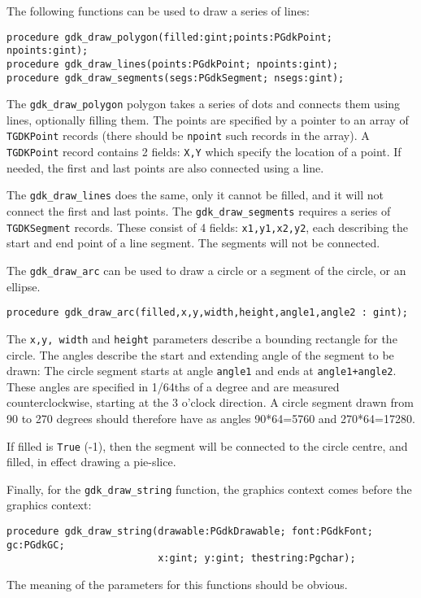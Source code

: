 \documentclass[10pt]{article}
\newcommand{\var}[1]{\texttt{#1}}
\begin{document}
The following functions can be used to draw a series of lines:
\begin{verbatim}
procedure gdk_draw_polygon(filled:gint;points:PGdkPoint; npoints:gint);
procedure gdk_draw_lines(points:PGdkPoint; npoints:gint);
procedure gdk_draw_segments(segs:PGdkSegment; nsegs:gint);
\end{verbatim}
The \var{gdk\_draw\_polygon} polygon takes a series of dots and connects 
them using lines, optionally filling them. The points are specified by a
pointer to an array of \var{TGDKPoint} records (there should be \var{npoint}
such records in the array). 
A \var{TGDKPoint} record contains 2 fields: \var{X,Y} which specify the 
location of a point. 
If needed, the first and last points are also connected using a line.

The \var{gdk\_draw\_lines} does the same, only it cannot be filled, and it 
will not connect the first and last points.
The \var{gdk\_draw\_segments} requires a series of \var{TGDKSegment}
records. These consist of 4 fields: \var{x1,y1,x2,y2}, each describing
the start and end point of a line segment. The segments will not be
connected.

The \var{gdk\_draw\_arc} can be used to draw a circle or a segment of
the circle, or an ellipse.
\begin{verbatim}
procedure gdk_draw_arc(filled,x,y,width,height,angle1,angle2 : gint);
\end{verbatim}
The \var{x,y, width} and \var{height} parameters describe a bounding
rectangle for the circle. The angles describe the start and extending 
angle of the segment to be drawn: The circle segment starts at angle
\var{angle1} and ends at \var{angle1+angle2}. These angles are specified 
in 1/64ths of a degree and are measured counterclockwise, starting at 
the 3 o'clock direction. A circle segment drawn from 90 to 270 degrees 
should therefore have as angles 90*64=5760 and 270*64=17280.

If filled is \var{True} (-1), then the segment will be connected to
the circle centre, and filled, in effect drawing a pie-slice.

Finally, for the \var{gdk\_draw\_string} function, the graphics context comes
before the graphics context:
\begin{verbatim}
procedure gdk_draw_string(drawable:PGdkDrawable; font:PGdkFont; gc:PGdkGC;
                          x:gint; y:gint; thestring:Pgchar);
\end{verbatim}
The meaning of the parameters for this functions should be obvious.
\end{document}
